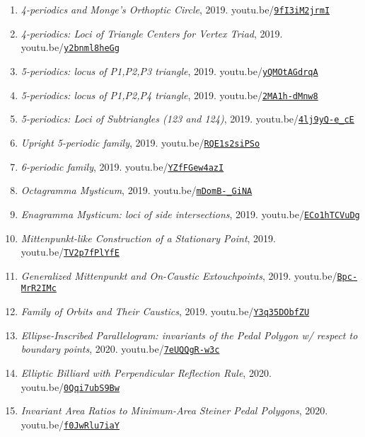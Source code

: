\documentclass[12pt]{article}
\begin{document}
\begin{enumerate}[resume]
\item \textit{4-periodics and Monge's Orthoptic Circle}, 2019. youtu.be/\href{https://youtu.be/9fI3iM2jrmI}{\nolinkurl{9fI3iM2jrmI}}
\item \textit{4-periodics: Loci of Triangle Centers for Vertex Triad}, 2019. youtu.be/\href{https://youtu.be/y2bnml8heGg}{\nolinkurl{y2bnml8heGg}}
\item \textit{5-periodics: locus of P1,P2,P3 triangle}, 2019. youtu.be/\href{https://youtu.be/yQMOtAGdrqA}{\nolinkurl{yQMOtAGdrqA}}
\item \textit{5-periodics: locus of P1,P2,P4 triangle}, 2019. youtu.be/\href{https://youtu.be/2MA1h-dMnw8}{\nolinkurl{2MA1h-dMnw8}}
\item \textit{5-periodics: Loci of Subtriangles (123 and 124)}, 2019. youtu.be/\href{https://youtu.be/4lj9yQ-e_cE}{\nolinkurl{4lj9yQ-e\_cE}}
\item \textit{Upright 5-periodic family}, 2019. youtu.be/\href{https://youtu.be/RQE1s2siPSo}{\nolinkurl{RQE1s2siPSo}}
\item \textit{6-periodic family}, 2019. youtu.be/\href{https://youtu.be/YZfFGew4azI}{\nolinkurl{YZfFGew4azI}}
\item \textit{Octagramma Mysticum}, 2019. youtu.be/\href{https://youtu.be/mDomB-_GiNA}{\nolinkurl{mDomB-\_GiNA}}
\item \textit{Enagramma Mysticum: loci of side intersections}, 2019. youtu.be/\href{https://youtu.be/ECo1hTCVuDg}{\nolinkurl{ECo1hTCVuDg}}
\item \textit{Mittenpunkt-like Construction of a Stationary Point}, 2019. youtu.be/\href{https://youtu.be/TV2p7fPlYfE}{\nolinkurl{TV2p7fPlYfE}}
\item \textit{Generalized Mittenpunkt and On-Caustic Extouchpoints}, 2019. youtu.be/\href{https://youtu.be/Bpc-MrR2IMc}{\nolinkurl{Bpc-MrR2IMc}}
\item \textit{Family of Orbits and Their Caustics}, 2019. youtu.be/\href{https://youtu.be/Y3q35DObfZU}{\nolinkurl{Y3q35DObfZU}}
\item \textit{Ellipse-Inscribed Parallelogram: invariants of the Pedal Polygon w/ respect to boundary points}, 2020. youtu.be/\href{https://youtu.be/7eUQQgR-w3c}{\nolinkurl{7eUQQgR-w3c}}
\item \textit{Elliptic Billiard with Perpendicular Reflection Rule}, 2020. youtu.be/\href{https://youtu.be/0Qqi7ubS9Bw}{\nolinkurl{0Qqi7ubS9Bw}}
\item \textit{Invariant Area Ratios to Minimum-Area Steiner Pedal Polygons}, 2020. youtu.be/\href{https://youtu.be/f0JwRlu7iaY}{\nolinkurl{f0JwRlu7iaY}}

\end{enumerate}
\end{document}
